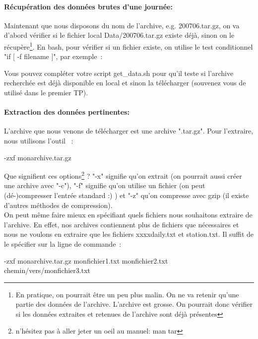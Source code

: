 \paragraph{Récupération des données brutes d'une journée:}

Maintenant que nous disposons du nom de l'archive, e.g. 200706.tar.gz, on va d'abord vérifier si le fichier local Data/200706.tar.gz existe déjà, sinon on le récupère\footnote{En pratique, on pourrait être un peu plus malin. On ne va retenir qu'une partie des données de l'archive. L'archive est grosse. On pourrait donc vérifier si les données extraites et retenues de l'archive sont déjà présentes}. En bash, pour vérifier si un fichier existe, on utilise le test conditionnel "if [ -f filename ]", par exemple~:

\cprotect{}
Vous pouvez compléter votre script get\_data.sh pour qu'il teste si l'archive recherchée est déjà disponible en local et sinon la télécharger (souvenez vous de \wget utilisé dans le premier TP).\\

\paragraph{Extraction des données pertinentes:} L'archive que nous venons de télécharger est une archive ".tar.gz". Pour l'extraire, nous utilisons l'outil \tar~:
\begin{center}
\tar   -zxf monarchive.tar.gz
\end{center}
Que signifient ces options\footnote{n'hésitez pas à aller jeter un oeil au manuel: man tar} ? "-x" signifie qu'on extrait (on pourrait aussi créer une archive avec "-c"), "-f" signifie qu'on utilise un fichier (on peut (dé-)compresser l'entrée standard :) ) et "-z" qu'on compresse avec gzip (il existe d'autres méthodes de compression).\\

On peut même faire mieux en spécifiant quels fichiers nous souhaitons extraire de l'archive. En effet, nos archives contiennent plus de fichiers que nécessaires et nous ne voulons en extraire que les fichiers xxxxdaily.txt et station.txt. Il suffit de le spécifier sur la ligne de commande~:
\begin{center}
\tar -zxf monarchive.tar.gz monfichier1.txt monfichier2.txt chemin/vers/monfichier3.txt
\end{center}

